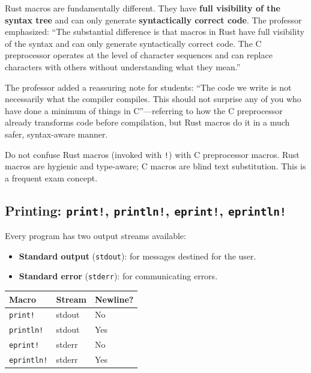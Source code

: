 Rust macros are fundamentally different. They have \textbf{full visibility of the syntax tree} and can only generate \textbf{syntactically correct code}. The professor emphasized: ``The substantial difference is that macros in Rust have full visibility of the syntax and can only generate syntactically correct code. The C preprocessor operates at the level of character sequences and can replace characters with others without understanding what they mean.''

The professor added a reassuring note for students: ``The code we write is not necessarily what the compiler compiles. This should not surprise any of you who have done a minimum of things in C''---referring to how the C preprocessor already transforms code before compilation, but Rust macros do it in a much safer, syntax-aware manner.

\begin{warningbox}
Do not confuse Rust macros (invoked with \texttt{!}) with C preprocessor macros. Rust macros are hygienic and type-aware; C macros are blind text substitution. This is a frequent exam concept.
\end{warningbox}

\subsection{Printing: \texttt{print!}, \texttt{println!}, \texttt{eprint!}, \texttt{eprintln!}}

Every program has two output streams available:
\begin{itemize}
    \item \textbf{Standard output} (\texttt{stdout}): for messages destined for the user.
    \item \textbf{Standard error} (\texttt{stderr}): for communicating errors.
\end{itemize}

\begin{center}
\begin{tabular}{|l|l|l|}
\hline
\textbf{Macro} & \textbf{Stream} & \textbf{Newline?} \\
\hline
\texttt{print!} & stdout & No \\
\texttt{println!} & stdout & Yes \\
\texttt{eprint!} & stderr & No \\
\texttt{eprintln!} & stderr & Yes \\
\hline
\end{tabular}
\end{center}

